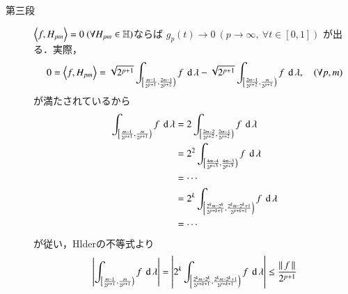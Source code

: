 \begin{prf}
\begin{description}
			\item[第三段]
				$\inprod<f,H_{pm}> = 0\ (\forall H_{pm} \in \mathbb{H})$ならば
				$g_p(t) \longrightarrow 0\ (p \longrightarrow \infty,\ \forall t \in [0,1])$
				が出る．実際，
				\begin{align}
					0 = \inprod<f,H_{pm}> 
					= \sqrt{2^{p+1}} \int_{\left[ \frac{m-1}{2^{p+1}}, \frac{2m-1}{2^{p+2}} \right)} f \dx\lambda
						-  \sqrt{2^{p+1}} \int_{\left[ \frac{2m-1}{2^{p+2}}, \frac{m}{2^{p+1}} \right)} f \dx\lambda
					,\quad (\forall p,m)
				\end{align}
				が満たされているから
				\begin{align}
					\int_{\left[ \frac{m-1}{2^{p+1}}, \frac{m}{2^{p+1}} \right)} f \ \operatorname{d}\lambda
					&= 2 \int_{\left[ \frac{2m-2}{2^{p+2}}, \frac{2m-1}{2^{p+2}} \right)} f \ \operatorname{d}\lambda \\
					&= 2^2 \int_{\left[ \frac{4m-4}{2^{p+3}}, \frac{4m-3}{2^{p+3}} \right)} f \ \operatorname{d}\lambda \\
					&= \cdots \\
					&= 2^k \int_{\left[ \frac{2^km-2^k}{2^{p+k+1}}, \frac{2^km-2^k+1}{2^{p+k+1}} \right)} f \ \operatorname{d}\lambda \\
					&= \cdots
				\end{align}
				が従い，Hlderの不等式より
				\begin{align}
					\left| \int_{\left[ \frac{m-1}{2^{p+1}}, \frac{m}{2^{p+1}} \right)} f \ \operatorname{d}\lambda \right|
					= \left| 2^k \int_{\left[ \frac{2^km-2^k}{2^{p+k+1}}, \frac{2^km-2^k+1}{2^{p+k+1}} \right)} f \ \operatorname{d}\lambda \right|
					\leq \frac{\left\|\, f\, \right\|_{}}{2^{p+1}} 
				\end{align}
		\end{description}
	\end{prf}